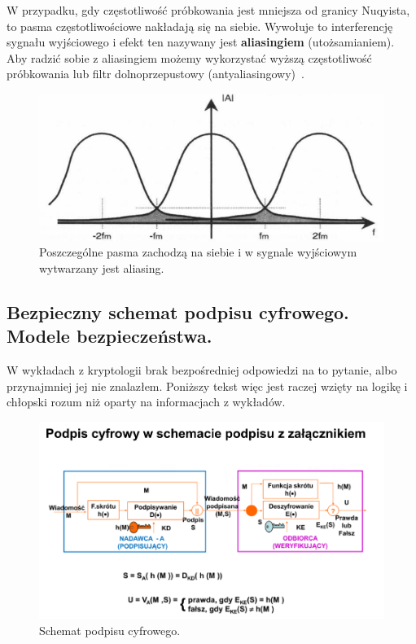 \documentclass[wi]{zut}
\begin{document}
W przypadku, gdy częstotliwość próbkowania jest mniejsza od granicy Nuqyista, to pasma częstotliwościowe nakładają się na siebie. Wywołuje to interferencję sygnału wyjściowego i efekt ten nazywany jest \textbf{aliasingiem} (utożsamianiem). Aby radzić sobie z aliasingiem możemy wykorzystać wyższą częstotliwość próbkowania lub filtr dolnoprzepustowy (antyaliasingowy)~\cite{Cariow_3}.

\begin{figure}[H]
    \centering
    \includegraphics[width=0.7\linewidth]{images/aliasign.png}
    \caption{Poszczególne pasma zachodzą na siebie i w sygnale wyjściowym wytwarzany jest aliasing.}
    \label{fig:aliasign}
\end{figure}


\subsection{Bezpieczny schemat podpisu cyfrowego. Modele bezpieczeństwa.}

W wykładach z kryptologii brak bezpośredniej odpowiedzi na to pytanie, albo przynajmniej jej nie znalazłem. Poniższy tekst więc jest raczej wzięty na logikę i chłopski rozum niż oparty na informacjach z wykładów.

\begin{figure}[H]
    \centering
    \includegraphics[width=0.7\linewidth]{images/podpis_cyfrowy.png}
    \caption{Schemat podpisu cyfrowego.}
    \label{fig:digital_signature}
\end{figure}
\end{document}
